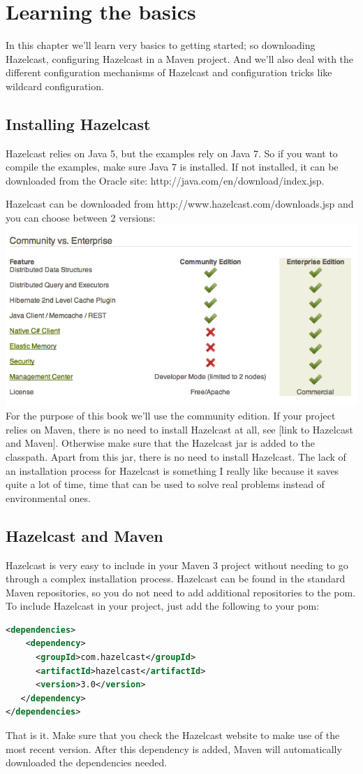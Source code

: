 \chapter{Learning the basics}
In this chapter we'll learn very basics to getting started; so downloading Hazelcast, configuring Hazelcast in a Maven project. And we'll also deal with the different configuration mechanisms of Hazelcast and configuration tricks like wildcard configuration.

\section{Installing Hazelcast}
Hazelcast relies on Java 5, but the examples rely on Java 7. So if you want to compile the examples, make sure Java 7 is installed. If not installed, it can be downloaded from the Oracle site: http://java.com/en/download/index.jsp.

Hazelcast can be downloaded from http://www.hazelcast.com/downloads.jsp and you can choose between 2 versions:
\includegraphics[scale=0.60]{hazelcast-editions.png}
For the purpose of this book we'll use the community edition. If your project relies on Maven, there is no need to install Hazelcast at all, see [link to Hazelcast and Maven]. Otherwise make sure that the Hazelcast jar is added to the classpath. Apart from this jar, there is no need to install Hazelcast.  The lack of an installation process for Hazelcast is something I really like because it saves quite a lot of time, time that can be used to solve real problems instead of environmental ones.

\section{Hazelcast and Maven}
Hazelcast is very easy to include in your Maven 3 project without needing to go through a complex installation process. Hazelcast can be found in the standard Maven repositories, so you do not need to add additional repositories to the pom. To include Hazelcast in your project, just add the following to your pom:
\begin{lstlisting}[language=xml]
<dependencies>	
    <dependency>
      <groupId>com.hazelcast</groupId>
      <artifactId>hazelcast</artifactId>
      <version>3.0</version>
   </dependency>
</dependencies>
\end{lstlisting}
That is it. Make sure that you check the Hazelcast website to make use of the most recent version. After this dependency is added, Maven will automatically downloaded the dependencies needed.

